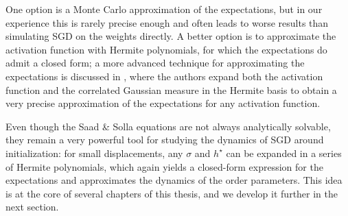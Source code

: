 One option is a Monte Carlo approximation of the expectations, but in our experience this is rarely precise enough and often leads to worse results than simulating SGD on the weights directly. A better option is to approximate the activation function with Hermite polynomials, for which the expectations do admit a closed form;
a more advanced technique for approximating the expectations is discussed in \citet{citton2024line}, where the authors expand both the activation function and the correlated Gaussian measure in the Hermite basis to obtain a very precise approximation of the expectations for any activation function.

Even though the Saad \& Solla equations are not always analytically solvable, they remain a very powerful tool for studying the dynamics of SGD around initialization: for small displacements, any \(\sigma\) and \(h^\star\) can be expanded in a series of Hermite polynomials, which again yields a closed-form expression for the expectations and approximates the dynamics of the order parameters. This idea is at the core of several chapters of this thesis, and we develop it further in the next section.


